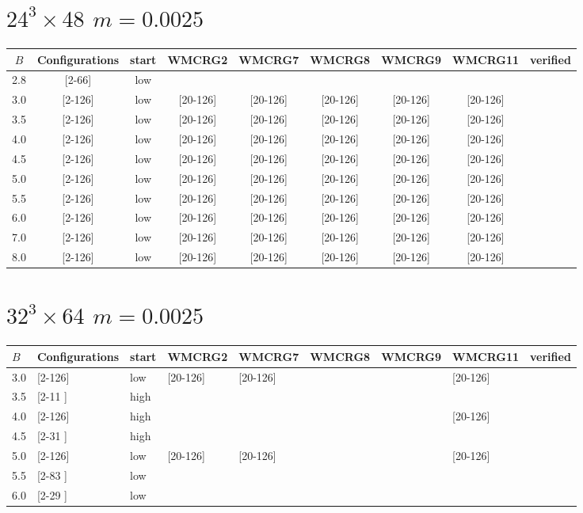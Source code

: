 \documentclass{article}
\begin{document}
  \section*{$24^3\times48$  $m=0.0025$}
    \begin{tabular}{| c | c | c | c | c | c | c | c | c |}
      \hline
      $B$ & Configurations & start & WMCRG2 & WMCRG7 & WMCRG8 & WMCRG9 & WMCRG11 & verified\\
      \hline
      2.8 & [2-66]  & low &  &  &  &  &  &\\
      3.0 & [2-126] & low & [20-126] & [20-126] & [20-126] & [20-126] & [20-126] &\\
      3.5 & [2-126] & low & [20-126] & [20-126] & [20-126] & [20-126] & [20-126] &\\
      4.0 & [2-126] & low & [20-126] & [20-126] & [20-126] & [20-126] & [20-126] &\\
      4.5 & [2-126] & low & [20-126] & [20-126] & [20-126] & [20-126] & [20-126] &\\
      5.0 & [2-126] & low & [20-126] & [20-126] & [20-126] & [20-126] & [20-126] &\\
      5.5 & [2-126] & low & [20-126] & [20-126] & [20-126] & [20-126] & [20-126] &\\
      6.0 & [2-126] & low & [20-126] & [20-126] & [20-126] & [20-126] & [20-126] &\\
      7.0 & [2-126] & low & [20-126] & [20-126] & [20-126] & [20-126] & [20-126] &\\
      8.0 & [2-126] & low & [20-126] & [20-126] & [20-126] & [20-126] & [20-126] &\\
      \hline
    \end{tabular}
  \section*{$32^3\times64$  $m=0.0025$}
    \begin{tabular}{| l | l | l | l | l | l | l | l | l |}
      \hline
      $B$ & Configurations & start & WMCRG2 & WMCRG7 & WMCRG8 & WMCRG9 & WMCRG11 & verified\\
      \hline
      3.0 & [2-126] & low  & [20-126] & [20-126] &  &  & [20-126] &\\
      3.5 & [2-11 ] & high &  &  &  &  &  &\\
      4.0 & [2-126] & high &  &  &  &  & [20-126] &\\
      4.5 & [2-31 ] & high &  &  &  &  &  &\\
      5.0 & [2-126] & low  & [20-126] & [20-126] &  &  & [20-126] &\\
      5.5 & [2-83 ] & low  &  &  &  &  &  &\\
      6.0 & [2-29 ] & low  &  &  &  &  &  &\\
      \hline
    \end{tabular}
\end{document}
